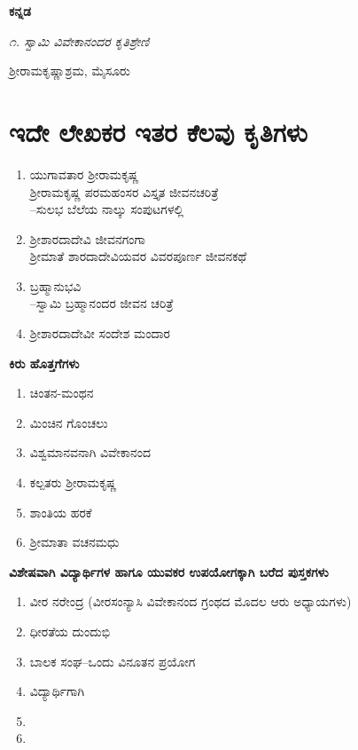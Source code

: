 
\textbf{ಕನ್ನಡ}

\textit{೧. ಸ್ವಾಮಿ ವಿವೇಕಾನಂದರ ಕೃತಿಶ್ರೇಣಿ }
\begin{flushright}
ಶ್ರೀರಾಮಕೃಷ್ಣಾಶ್ರಮ, ಮೈಸೂರು
\end{flushright}

\chapter{ಇದೇ ಲೇಖಕರ ಇತರ ಕೆಲವು ಕೃತಿಗಳು}

\begin{enumerate}
\item ಯುಗಾವತಾರ ಶ್ರೀರಾಮಕೃಷ್ಣ\\ಶ್ರೀರಾಮಕೃಷ್ಣ ಪರಮಹಂಸರ ವಿಸ್ತೃತ ಜೀವನಚರಿತ್ರೆ\\–ಸುಲಭ ಬೆಲೆಯ ನಾಲ್ಕು ಸಂಪುಟಗಳಲ್ಲಿ

 \item ಶ್ರೀಶಾರದಾದೇವಿ ಜೀವನಗಂಗಾ\\ಶ್ರೀಮಾತೆ ಶಾರದಾದೇವಿಯವರ ವಿವರಪೂರ್ಣ ಜೀವನಕಥೆ

 \item ಬ್ರಹ್ಮಾನುಭವಿ\\–ಸ್ವಾಮಿ ಬ್ರಹ್ಮಾನಂದರ ಜೀವನ ಚರಿತ್ರೆ

 \item ಶ್ರೀಶಾರದಾದೇವೀ ಸಂದೇಶ ಮಂದಾರ

\end{enumerate}

\begin{center}
\textbf{ಕಿರು ಹೊತ್ತಗೆಗಳು}
\end{center}

\begin{enumerate}
\item ಚಿಂತನ-ಮಂಥನ

 \item ಮಿಂಚಿನ ಗೊಂಚಲು

 \item ವಿಶ್ವಮಾನವನಾಗಿ ವಿವೇಕಾನಂದ

 \item ಕಲ್ಪತರು ಶ್ರೀರಾಮಕೃಷ್ಣ

 \item ಶಾಂತಿಯ ಹರಕೆ

 \item ಶ್ರೀಮಾತಾ ವಚನಮಧು

\end{enumerate}

\begin{center}
\textbf{ವಿಶೇಷವಾಗಿ ವಿದ್ಯಾರ್ಥಿಗಳ ಹಾಗೂ ಯುವಕರ ಉಪಯೋಗಕ್ಕಾಗಿ ಬರೆದ ಪುಸ್ತಕಗಳು}
\end{center}

\begin{enumerate}
\item ವೀರ ನರೇಂದ್ರ (ವೀರಸಂನ್ಯಾಸಿ ವಿವೇಕಾನಂದ ಗ್ರಂಥದ ಮೊದಲ ಆರು ಅಧ್ಯಾಯಗಳು)

 \item ಧೀರತೆಯ ದುಂದುಭಿ

 \item ಬಾಲಕ ಸಂಘ–ಒಂದು ವಿನೂತನ ಪ್ರಯೋಗ

 \item ವಿದ್ಯಾರ್ಥಿಗಾಗಿ

 \item {}

 \item {}

\end{enumerate}

